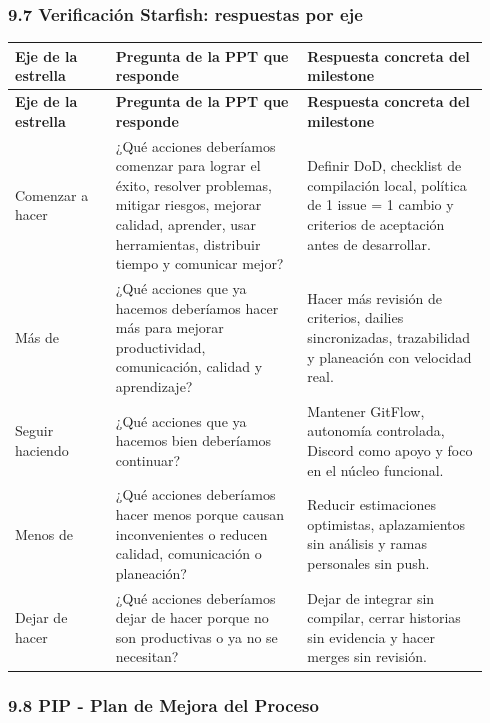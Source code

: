 \documentclass[11pt,a4paper]{article}
\begin{document}
\subsubsection{9.7 Verificación Starfish: respuestas por eje}

\begingroup
\scriptsize
\setlength{\tabcolsep}{3pt}
\begin{longtable}{P{0.20\linewidth}P{0.38\linewidth}P{0.36\linewidth}}
\toprule
\textbf{Eje de la estrella} & \textbf{Pregunta de la PPT que responde} & \textbf{Respuesta concreta del milestone} \\
\midrule
\endfirsthead
\toprule
\textbf{Eje de la estrella} & \textbf{Pregunta de la PPT que responde} & \textbf{Respuesta concreta del milestone} \\
\midrule
\endhead
\bottomrule
\endlastfoot
Comenzar a hacer & ¿Qué acciones deberíamos comenzar para lograr el éxito, resolver problemas, mitigar riesgos, mejorar calidad, aprender, usar herramientas, distribuir tiempo y comunicar mejor? & Definir DoD, checklist de compilación local, política de 1 issue = 1 cambio y criterios de aceptación antes de desarrollar. \\
Más de & ¿Qué acciones que ya hacemos deberíamos hacer más para mejorar productividad, comunicación, calidad y aprendizaje? & Hacer más revisión de criterios, dailies sincronizadas, trazabilidad y planeación con velocidad real. \\
Seguir haciendo & ¿Qué acciones que ya hacemos bien deberíamos continuar? & Mantener GitFlow, autonomía controlada, Discord como apoyo y foco en el núcleo funcional. \\
Menos de & ¿Qué acciones deberíamos hacer menos porque causan inconvenientes o reducen calidad, comunicación o planeación? & Reducir estimaciones optimistas, aplazamientos sin análisis y ramas personales sin push. \\
Dejar de hacer & ¿Qué acciones deberíamos dejar de hacer porque no son productivas o ya no se necesitan? & Dejar de integrar sin compilar, cerrar historias sin evidencia y hacer merges sin revisión. \\
\end{longtable}
\endgroup

\subsubsection{9.8 PIP - Plan de Mejora del Proceso}
\end{document}
